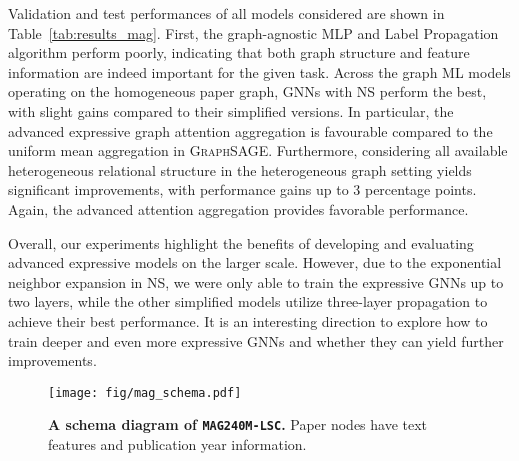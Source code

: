 \documentclass{article}
\newcommand{\ag}{\texttt{MAG240M-LSC}}
\begin{document}
{
Validation and test performances of all models considered are shown in Table~\ref{tab:results_mag}.
First, the graph-agnostic MLP and Label Propagation algorithm perform poorly, indicating that both graph structure and feature information are indeed important for the given task.
Across the graph ML models operating on the homogeneous paper graph, GNNs with NS perform the best, with slight gains compared to their simplified versions.
In particular, the advanced expressive graph attention aggregation is favourable compared to the uniform mean aggregation in \textsc{GraphSAGE}.
Furthermore, considering all available heterogeneous relational structure in the heterogeneous graph setting yields significant improvements, with performance gains up to 3 percentage points. 
Again, the advanced attention aggregation provides favorable performance.

Overall, our experiments highlight the benefits of developing and evaluating advanced expressive models on the larger scale.
However, due to the exponential neighbor expansion in \textsc{NS}, we were only able to train the expressive GNNs up to two layers, while the other simplified models utilize three-layer propagation to achieve their best performance.
It is an interesting direction to explore how to train deeper and even more expressive GNNs and whether they can yield further improvements.
}

\begin{figure}
      \centering
      \texttt{[image: fig/mag\_schema.pdf]}
\caption{\textbf{A schema diagram of \ag{}.} Paper nodes have text features and publication year information.
      }
      \label{fig:mag_schema}
\end{figure}
\end{document}
